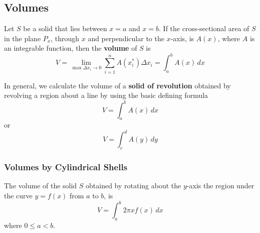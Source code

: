 \subsection{Volumes}

\begin{definition}
    Let \(S\) be a solid that lies between \(x=a\) and \(x=b\).
    If the cross-sectional area of \(S\) in the plane \(P_x\), through \(x\)
    and perpendicular to the \(x\)-axis, is \(A(x)\), where \(A\) is an
    integrable function, then the \textbf{volume} of \(S\) is
    \[V=\lim_{\max\Delta x_i\to 0}\sum_{i=1}^n A(x_i^*)\Delta x_i
    =\int_a^b A(x)\,dx\]
\end{definition}
In general, we calculate the volume of a \textbf{solid of revolution} obtained
by revolving a region about a line by using the basic defining formula
\[V=\int_a^b A(x)\,dx\]
or
\[V=\int_c^d A(y)\,dy\]

\subsubsection*{Volumes by Cylindrical Shells}

The volume of the solid \(S\) obtained by rotating about the \(y\)-axis the
region under the curve \(y=f(x)\) from \(a\) to \(b\), is
\[V=\int_a^b 2\pi xf(x)\,dx\]
where \(0\leq a<b\).